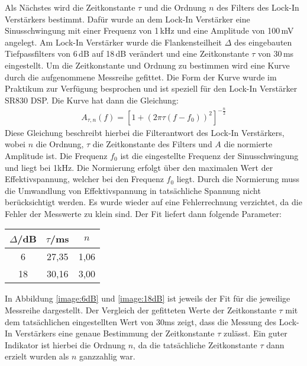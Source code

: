 Als Nächstes wird die Zeitkonstante $\tau$ und die Ordnung $n$ des Filters des Lock-In Verstärkers bestimmt. Dafür wurde an dem Lock-In Verstärker eine Sinusschwingung mit einer Frequenz von 1\,kHz und eine Amplitude von 100\,mV angelegt. Am Lock-In Verstärker wurde die Flankensteilheit $\Delta$ des eingebauten Tiefpassfilters von 6\,dB auf 18\,dB verändert und eine Zeitkonstante $\tau$ von 30\,ms eingestellt. Um die Zeitkonstante und Ordnung zu bestimmen wird eine Kurve durch die aufgenommene Messreihe gefittet. Die Form der Kurve wurde im Praktikum zur Verfügung besprochen und ist speziell für den Lock-In Verstärker SR830 DSP. Die Kurve hat dann die Gleichung:
\begin{gather}
    A_{\tau,n}(f) = \left[1 + (2\pi\tau(f-f_0))^2\right]^{-\frac{n}{2}}
\end{gather}
Diese Gleichung beschreibt hierbei die Filterantwort des Lock-In Verstärkers, wobei \newline $n$ die Ordnung, $\tau$ die Zeitkonstante des Filters und $A$ die normierte Amplitude ist. Die Frequenz $f_0$ ist die eingestellte Frequenz der Sinusschwingung und liegt bei 1kHz. Die Normierung erfolgt über den maximalen Wert der Effektivspannung, welcher bei den Frequenz $f_0$ liegt. Durch die Normierung muss die Umwandlung von Effektivspannung in tatsächliche Spannung nicht berücksichtigt werden. Es wurde wieder auf eine Fehlerrechnung verzichtet, da die Fehler der Messwerte zu klein sind. Der Fit liefert dann folgende Parameter:
\begin{center}
    \begin{tabular}{c | c c}
        $\Delta$/dB & $\tau$/ms & $n$\\
        \hline
        6  & 27,35 & 1,06 \\
        18 & 30,16 & 3,00 \\
    \end{tabular}
    \label{tab:fitPara}
\end{center}
In Abbildung \ref{image:6dB} und \ref{image:18dB} ist jeweils der Fit für die jeweilige Messreihe dargestellt. Der Vergleich der gefitteten Werte der Zeitkonstante $\tau$ mit dem tatsächlichen eingestellten Wert von 30ms zeigt, dass die Messung des Lock-In Verstärkers eine genaue Bestimmung der Zeitkonstante $\tau$ zulässt. Ein guter Indikator ist hierbei die Ordnung $n$, da die tatsächliche Zeitkonstante $\tau$ dann erzielt wurden als $n$ ganzzahlig war.

